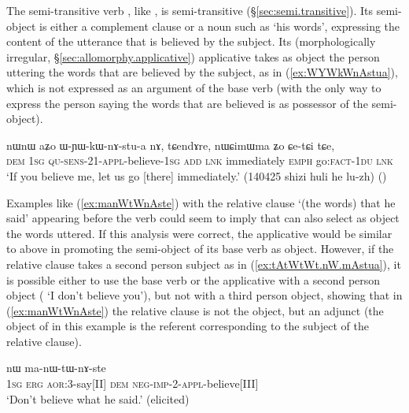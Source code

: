 The semi-transitive verb , like , is semi-transitive (§\ref{sec:semi.transitive}). Its semi-object is either a complement clause or a noun such as  `his words', expressing the content of the utterance that is believed by the subject. Its (morphologically irregular, §\ref{sec:allomorphy.applicative}) applicative  takes as object the person uttering the words that are believed by the subject, as in (\ref{ex:WYWkWnAstua}), which is not expressed as an argument of the base verb (with  the only way to express the person saying the words that are believed is as possessor of the semi-object).

\begin{exe}
\ex \label{ex:WYWkWnAstua}
\gll nɯnɯ aʑo ɯ-ɲɯ-kɯ-nɤ-stu-a nɤ, tɕendɤre, nɯɕimɯma ʑo ɕe-tɕi tɕe, \\
\textsc{dem} \textsc{1sg} \textsc{qu}-\textsc{sens}-2\fl{}1-\textsc{appl}-believe-\textsc{1sg} \textsc{add} \textsc{lnk} immediately \textsc{emph} go:\textsc{fact}-\textsc{1du} \textsc{lnk} \\
\glt `If you believe me, let us go [there] immediately.' (140425 shizi huli he lu-zh)
()
\end{exe}

Examples like (\ref{ex:manWtWnAste}) with the relative clause  `(the words) that he said' appearing before the verb could seem to imply that  can also select as object the words uttered. If this analysis were correct, the applicative  would be similar to  above in promoting the semi-object of its base verb as object. However, if the relative clause takes a second person subject as in (\ref{ex:tAtWtWt.nW.mAstua}), it is possible either to use the base verb  or the applicative  with a second person object ( `I don't believe you'), but not with a third person object, showing that in (\ref{ex:manWtWnAste}) the relative clause is not the object, but an adjunct (the object of  in this example is the referent corresponding to the subject of the relative clause).

\begin{exe}
\ex \label{ex:manWtWnAste}
 nɯ ma-nɯ-tɯ-nɤ-ste \\
\textsc{1sg} \textsc{erg} \textsc{aor}:3\flobv{}-say[II] \textsc{dem} \textsc{neg}-\textsc{imp}-2-\textsc{appl}-believe[III] \\
\glt `Don't believe what he said.' (elicited)
\end{exe}


